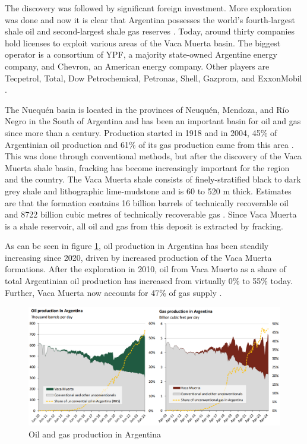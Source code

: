 The discovery was followed by significant foreign investment. More exploration was done and now it is clear that Argentina possesses the world’s fourth-largest shale oil and second-largest shale gas reserves \autocite{internationaltradeadministrationArgentinaCountryCommercial2025}. Today, around thirty companies hold licenses to exploit various areas of the Vaca Muerta basin. The biggest operator is a consortium of YPF, a majority state-owned Argentine energy company, and Chevron, an American energy company. Other players are Tecpetrol, Total, Dow Petrochemical, Petronas, Shell, Gazprom, and ExxonMobil \autocite{fogliaSedArena2023}.

The Nuequén basin is located in the provinces of Neuquén, Mendoza, and Río Negro in the South of Argentina and has been an important basin for oil and gas since more than a century. Production started in 1918 and in 2004, 45\% of Argentinian oil production and 61\% of its gas production came from this area \autocite{u.s.energyinformationadministrationTechnicallyRecoverableShale2013}. This was done through conventional methods, but after the discovery of the Vaca Muerta shale basin, fracking has become increasingly important for the region and the country. The Vaca Muerta shale consists of finely-stratified black to dark grey shale and lithographic lime-mudstone and is 60 to 520 m thick. Estimates are that the formation contains 16 billion barrels of technically recoverable oil and 8722 billion cubic metres of technically recoverable gas \autocite{u.s.energyinformationadministrationTechnicallyRecoverableShale2013}. Since Vaca Muerta is a shale reservoir, all oil and gas from this deposit is extracted by fracking.

As can be seen in figure \ref{fig:oilgasprod}, oil production in Argentina has been steadily increasing since 2020, driven by increased production of the Vaca Muerta formations. After the exploration in 2010, oil from Vaca Muerto as a share of total Argentinian oil production has increased from virtually 0\% to 55\% today. Further, Vaca Muerta now accounts for 47\% of gas supply \autocite{internationaltradeadministrationArgentinaCountryCommercial2025}.

\begin{figure}[H]
    \centering
    \includegraphics[width=1\linewidth]{figures/ch9/oilgasproduction.png}
    \caption{Oil and gas production in Argentina \autocite{internationaltradeadministrationArgentinaCountryCommercial2025}}
    \label{fig:oilgasprod}
\end{figure}

